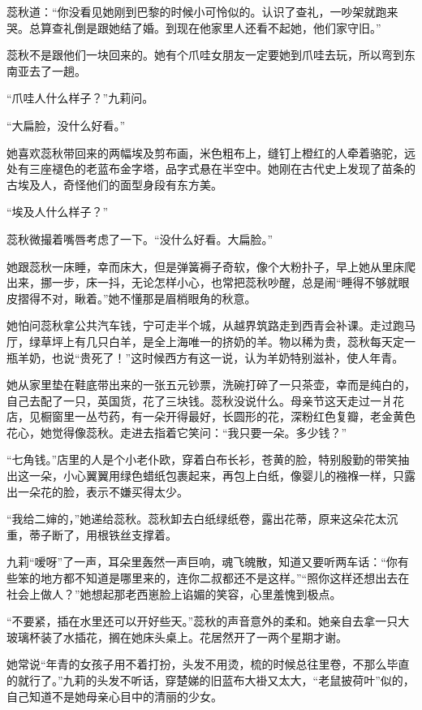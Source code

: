 \par 蕊秋道：“你没看见她刚到巴黎的时候小可怜似的。认识了查礼，一吵架就跑来哭。总算查礼倒是跟她结了婚。到现在他家里人还看不起她，他们家守旧。”
\par 蕊秋不是跟他们一块回来的。她有个爪哇女朋友一定要她到爪哇去玩，所以弯到东南亚去了一趟。
\par “爪哇人什么样子？”九莉问。
\par “大扁脸，没什么好看。”
\par 她喜欢蕊秋带回来的两幅埃及剪布画，米色粗布上，缝钉上橙红的人牵着骆驼，远处有三座褪色的老蓝布金字塔，品字式悬在半空中。她刚在古代史上发现了苗条的古埃及人，奇怪他们的面型身段有东方美。
\par “埃及人什么样子？”
\par 蕊秋微撮着嘴唇考虑了一下。“没什么好看。大扁脸。”
\par 她跟蕊秋一床睡，幸而床大，但是弹簧褥子奇软，像个大粉扑子，早上她从里床爬出来，挪一步，床一抖，无论怎样小心，也常把蕊秋吵醒，总是闹“睡得不够就眼皮摺得不对，瞅着。”她不懂那是眉梢眼角的秋意。
\par 她怕问蕊秋拿公共汽车钱，宁可走半个城，从越界筑路走到西青会补课。走过跑马厅，绿草坪上有几只白羊，是全上海唯一的挤奶的羊。物以稀为贵，蕊秋每天定一瓶羊奶，也说“贵死了！”这时候西方有这一说，认为羊奶特别滋补，使人年青。
\par 她从家里垫在鞋底带出来的一张五元钞票，洗碗打碎了一只茶壶，幸而是纯白的，自己去配了一只，英国货，花了三块钱。蕊秋没说什么。母亲节这天走过一爿花店，见橱窗里一丛芍药，有一朵开得最好，长圆形的花，深粉红色复瓣，老金黄色花心，她觉得像蕊秋。走进去指着它笑问：“我只要一朵。多少钱？”
\par “七角钱。”店里的人是个小老仆欧，穿着白布长衫，苍黄的脸，特别殷勤的带笑抽出这一朵，小心翼翼用绿色蜡纸包裹起来，再包上白纸，像婴儿的襁褓一样，只露出一朵花的脸，表示不嫌买得太少。
\par “我给二婶的，”她递给蕊秋。蕊秋卸去白纸绿纸卷，露出花蒂，原来这朵花太沉重，蒂子断了，用根铁丝支撑着。
\par 九莉“嗳呀”了一声，耳朵里轰然一声巨响，魂飞魄散，知道又要听两车话：“你有些笨的地方都不知道是哪里来的，连你二叔都还不是这样。”“照你这样还想出去在社会上做人？”她想起那老西崽脸上谄媚的笑容，心里羞愧到极点。
\par “不要紧，插在水里还可以开好些天。”蕊秋的声音意外的柔和。她亲自去拿一只大玻璃杯装了水插花，搁在她床头桌上。花居然开了一两个星期才谢。
\par 她常说“年青的女孩子用不着打扮，头发不用烫，梳的时候总往里卷，不那么毕直的就行了。”九莉的头发不听话，穿楚娣的旧蓝布大褂又太大，“老鼠披荷叶”似的，自己知道不是她母亲心目中的清丽的少女。
